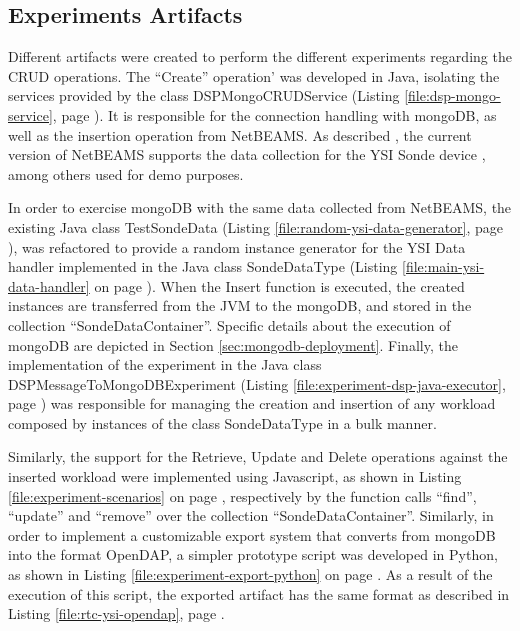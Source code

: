 \subsection{Experiments Artifacts}

Different artifacts were created to perform the different experiments regarding
the CRUD operations. The ``Create'' operation' was developed in Java, isolating
the services provided by the class DSPMongoCRUDService (Listing
\ref{file:dsp-mongo-service}, page \pageref{file:dsp-mongo-service}). It is
responsible for the connection handling with mongoDB, as well as the insertion
operation from NetBEAMS. As described \cite{netbeams-dsp-architecture}, the
current version of NetBEAMS supports the data collection for the YSI Sonde
device \cite{YSI-Sonde}, among others used for demo purposes.

In order to exercise mongoDB with the same data collected from NetBEAMS, the
existing Java class TestSondeData (Listing
\ref{file:random-ysi-data-generator}, page
\pageref{file:random-ysi-data-generator}), was refactored to provide a random
instance generator for the YSI Data handler implemented in the Java class
SondeDataType (Listing \ref{file:main-ysi-data-handler} on page
\pageref{file:main-ysi-data-handler}). When the Insert function is executed,
the created instances are transferred from the JVM to the mongoDB, and stored
in the collection ``SondeDataContainer''. Specific details about the execution
of mongoDB are depicted in Section \ref{sec:mongodb-deployment}. Finally, the
implementation of the experiment in the Java class
DSPMessageToMongoDBExperiment (Listing
\ref{file:experiment-dsp-java-executor}, page
\pageref{file:experiment-dsp-java-executor}) was responsible for managing the
creation and insertion of any workload composed by instances of the class
SondeDataType in a bulk manner.

Similarly, the support for the Retrieve, Update and Delete operations against
the inserted workload were implemented using Javascript, as shown in Listing
\ref{file:experiment-scenarios} on page \pageref{file:experiment-scenarios},
respectively by the function calls ``find'', ``update'' and ``remove'' over
the collection ``SondeDataContainer''. Similarly, in order to implement a
customizable export system that converts from mongoDB into the format OpenDAP,
a simpler prototype script was developed in Python, as shown in Listing
\ref{file:experiment-export-python} on page
\pageref{file:experiment-export-python}. As a result of the execution of this
script, the exported artifact has the same format as described in Listing
\ref{file:rtc-ysi-opendap}, page \pageref{file:rtc-ysi-opendap}.

